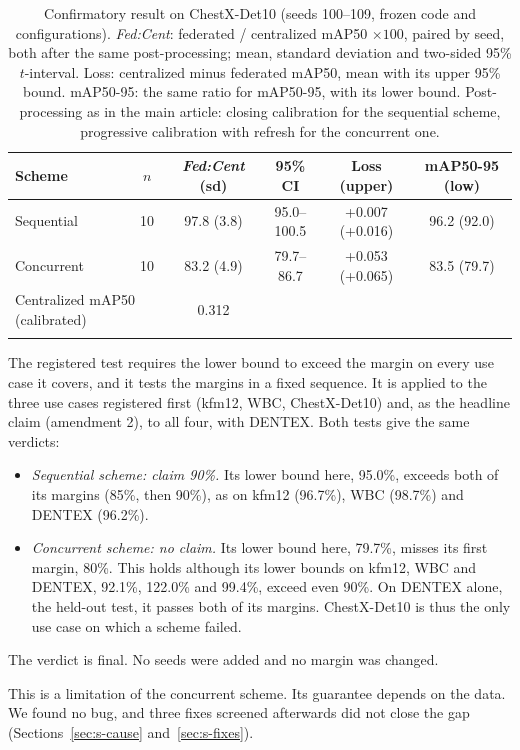 \documentclass[pdflatex,sn-mathphys-num]{sn-jnl}
\newcommand{\fedcent}{\textit{Fed:Cent}}
\begin{document}
\begin{table}[h]
\caption{Confirmatory result on ChestX-Det10 (seeds 100--109, frozen code and configurations). \fedcent{}: federated / centralized mAP50 $\times100$, paired by seed, both after the same post-processing; mean, standard deviation and two-sided 95\% $t$-interval. Loss: centralized minus federated mAP50, mean with its upper 95\% bound. mAP50-95: the same ratio for mAP50-95, with its lower bound. Post-processing as in the main article: closing calibration for the sequential scheme, progressive calibration with refresh for the concurrent one.}\label{tab:s-confirm}
\footnotesize
\setlength{\tabcolsep}{3pt}
\begin{tabular*}{\textwidth}{@{\extracolsep\fill}lccccc}
\toprule
Scheme & $n$ & \fedcent{} (sd) & 95\% CI & Loss (upper) & mAP50-95 (low) \\
\midrule
Sequential & 10 & 97.8 (3.8) & 95.0--100.5 & +0.007 (+0.016) & 96.2 (92.0) \\
Concurrent & 10 & 83.2 (4.9) & 79.7--86.7 & +0.053 (+0.065) & 83.5 (79.7) \\
\midrule
\multicolumn{2}{l}{Centralized mAP50 (calibrated)} & 0.312 & & & \\
\botrule
\end{tabular*}
\end{table}

The registered test requires the lower bound to exceed the margin on every use case it covers, and it tests the margins in a fixed sequence. It is applied to the three use cases registered first (kfm12, WBC, ChestX-Det10) and, as the headline claim (amendment 2), to all four, with DENTEX. Both tests give the same verdicts:
\begin{itemize}
\item \emph{Sequential scheme: claim 90\%.} Its lower bound here, 95.0\%, exceeds both of its margins (85\%, then 90\%), as on kfm12 (96.7\%), WBC (98.7\%) and DENTEX (96.2\%).
\item \emph{Concurrent scheme: no claim.} Its lower bound here, 79.7\%, misses its first margin, 80\%. This holds although its lower bounds on kfm12, WBC and DENTEX, 92.1\%, 122.0\% and 99.4\%, exceed even 90\%. On DENTEX alone, the held-out test, it passes both of its margins. ChestX-Det10 is thus the only use case on which a scheme failed.
\end{itemize}
The verdict is final. No seeds were added and no margin was changed.

This is a limitation of the concurrent scheme. Its guarantee depends on the data. We found no bug, and three fixes screened afterwards did not close the gap (Sections~\ref{sec:s-cause} and~\ref{sec:s-fixes}).
\end{document}
